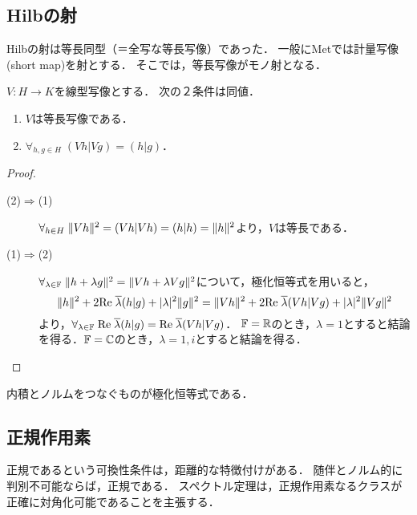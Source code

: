 \documentclass[uplatex,dvipdfmx]{jsreport}
\begin{document}
\subsection{Hilbの射}

\begin{tcolorbox}[colframe=ForestGreen, colback=ForestGreen!10!white,breakable,colbacktitle=ForestGreen!40!white,coltitle=black,fonttitle=\bfseries\sffamily,
title=]
    Hilbの射は等長同型（＝全写な等長写像）であった．
    一般にMetでは計量写像(short map)を射とする．
    そこでは，等長写像がモノ射となる．
\end{tcolorbox}

\begin{proposition}[モノ射の内積による特徴付け]\label{prop-characterization-of-isometry}
    $V:H\to K$を線型写像とする．
    次の２条件は同値．
    \begin{enumerate}
        \item $V$は等長写像である．
        \item $\forall_{h,g\in H}\;(Vh|Vg)=(h|g)$．
    \end{enumerate}
\end{proposition}
\begin{proof}\mbox{}
    \begin{description}
        \item[(2)$\Rightarrow$(1)] $\forall_{h\in H}\;\|Vh\|^2=(Vh|Vh)=(h|h)=\|h\|^2$より，$V$は等長である．
        \item[(1)$\Rightarrow$(2)] $\forall_{\lambda\in\mathbb{F}}\;\|h+\lambda g\|^2=\|Vh+\lambda Vg\|^2$について，極化恒等式を用いると，
        \[\|h\|^2+2\mathrm{Re}\;\overline{\lambda}(h|g)+\lvert\lambda\rvert^2\|g\|^2=\|Vh\|^2+2\mathrm{Re}\;\overline{\lambda}(Vh|Vg)+\lvert\lambda\rvert^2\|Vg\|^2\]
        より，$\forall_{\lambda\in\mathbb{F}}\;\mathrm{Re}\;\overline{\lambda}(h|g)=\mathrm{Re}\;\overline{\lambda}(Vh|Vg)$．
        $\mathbb{F}=\mathbb{R}$のとき，$\lambda=1$とすると結論を得る．$\mathbb{F}=\mathbb{C}$のとき，$\lambda=1,i$とすると結論を得る．
    \end{description}
\end{proof}
\begin{remarks}
    内積とノルムをつなぐものが極化恒等式である．
\end{remarks}

\subsection{正規作用素}

\begin{tcolorbox}[colframe=ForestGreen, colback=ForestGreen!10!white,breakable,colbacktitle=ForestGreen!40!white,coltitle=black,fonttitle=\bfseries\sffamily,
title=]
    正規であるという可換性条件は，距離的な特徴付けがある．
    随伴とノルム的に判別不可能ならば，正規である．
    スペクトル定理は，正規作用素なるクラスが正確に対角化可能であることを主張する．
\end{tcolorbox}
\end{document}
